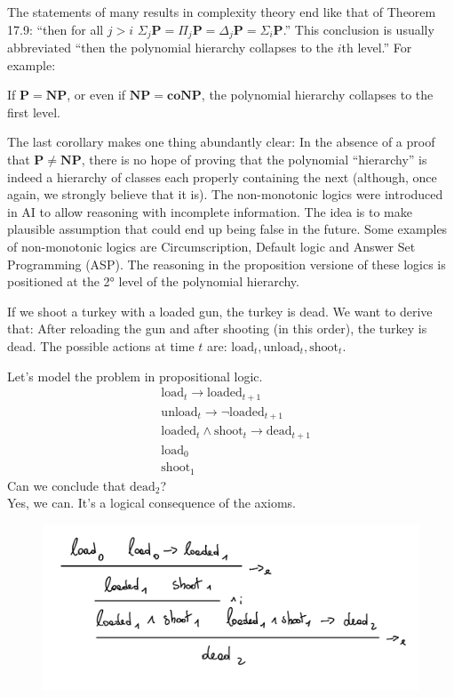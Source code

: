 The statements of many results in complexity theory end like that of Theorem 17.9: ``then for all $j > i$ $\Sigma_j\mathbf{P} = \Pi_j\mathbf{P} = \Delta_j\mathbf{P} = \Sigma_i\mathbf{P}$.'' This conclusion is usually abbreviated ``then the polynomial hierarchy collapses to the $i$th level.'' For example:

\begin{defbox}[Corollary]
If $\mathbf{P} = \mathbf{NP}$, or even if $\mathbf{NP} = \mathbf{coNP}$, the polynomial hierarchy collapses to the first level.
\end{defbox}
The last corollary makes one thing abundantly clear: In the absence of a proof that $\mathbf{P} \neq \mathbf{NP}$, there is no hope of proving that the polynomial ``hierarchy'' is indeed a hierarchy of classes each properly containing the next (although, once again, we strongly believe that it is).
The non-monotonic logics were introduced in AI to allow reasoning with incomplete information. The idea is to make plausible assumption that could end up being false in the future. Some examples of non-monotonic logics are Circumscription, Default logic and Answer Set Programming (ASP). The reasoning in the proposition versione of these logics is positioned at the 2° level of the polynomial hierarchy.
\begin{defbox}
    If we shoot a turkey with a loaded gun, the turkey is dead. We want to derive that: After reloading the gun and after shooting (in this order), the turkey is dead. The possible actions at time $t$ are: $\text{load}_t, \text{unload}_t, \text{shoot}_t$.
\end{defbox}
Let's model the problem in propositional logic.
\begin{align*}
    &\text{load}_t\to \text{loaded}_{t+1}\\
    &\text{unload}_t\to \neg \text{loaded}_{t+1}\\
    &\text{loaded}_t\land \text{shoot}_t\to \text{dead}_{t+1}\\
    &\text{load}_0 \\
    &\text{shoot}_1 
\end{align*}
Can we conclude that $\text{dead}_2$? 
\\
Yes, we can. It's a logical consequence of the axioms.
\begin{figure}[h]
    \centering
    \includegraphics[width=1\textwidth]{img/ysp1.jpeg}
\end{figure}
